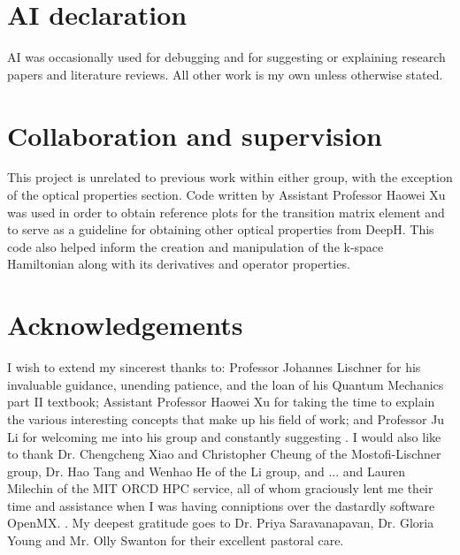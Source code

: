 \documentclass[11pt,a4paper,twoside]{report}  %
\numberwithin{equation}{section}					%
\numberwithin{figure}{section}						%
\begin{document}
\cleardoublepage

\tableofcontents


\section*{ }


\section*{AI declaration}    %

AI was occasionally used for debugging and for suggesting or explaining research papers and literature reviews. All other work is my own unless otherwise stated.

\section*{Collaboration and supervision}    %

This project is unrelated to previous work within either group, with the exception of the optical properties section. Code written by Assistant Professor Haowei Xu was used in order to obtain reference plots for the transition matrix element and to serve as a guideline for obtaining other optical properties from DeepH. This code also helped inform the creation and manipulation of the k-space Hamiltonian along with its derivatives and operator properties. 

\section*{Acknowledgements}

I wish to extend my sincerest thanks to: Professor Johannes Lischner for his invaluable guidance, unending patience, and the loan of his Quantum Mechanics part II textbook; Assistant Professor Haowei Xu for taking the time to explain the various interesting concepts that make up his field of work; and Professor Ju Li for welcoming me into his group and constantly suggesting . I would also like to thank Dr. Chengcheng Xiao and  Christopher Cheung of the Mostofi-Lischner group, Dr. Hao Tang and Wenhao He of the Li group, and ... and Lauren Milechin of the MIT ORCD HPC service, all of whom graciously lent me their time and assistance when I was having conniptions over the dastardly software OpenMX. . My deepest gratitude goes to Dr. Priya Saravanapavan, Dr. Gloria Young and Mr. Olly Swanton for their excellent pastoral care. 
\end{document}
